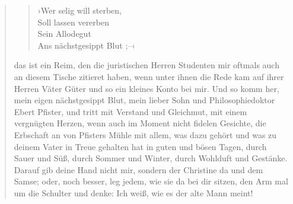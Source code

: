 \begin{verse}
\begin{verse}
›Wer selig will sterben,\\
Soll lassen vererben\\
Sein Allodegut\\
Ans nächstgesippt Blut ;–‹
\end{verse}
\noindent
das ist ein Reim,
den die juristischen Herren Studenten mir oftmals auch an diesem
Tische zitieret haben, wenn unter ihnen die Rede kam auf ihrer
Herren Väter Güter und so ein kleines Konto bei mir. Und so komm
her, mein eigen nächstgesippt Blut, mein lieber Sohn und
Philosophiedoktor Ebert Pfister, und tritt mit Verstand und
Gleichmut, mit einem vergnügten Herzen, wenn auch im Moment nicht
fidelen Gesichte, die Erbschaft an von Pfisters Mühle mit allem,
was dazu gehört und was zu deinem Vater in Treue gehalten hat in
guten und bösen Tagen, durch Sauer und Süß, durch Sommer und
Winter, durch Wohlduft und Gestänke. Darauf gib deine Hand nicht
mir, sondern der Christine da und dem Samse; oder, noch besser, leg
jedem, wie sie da bei dir sitzen, den Arm mal um die Schulter und
denke: Ich weiß, wie es der alte Mann meint!


\end{verse}
